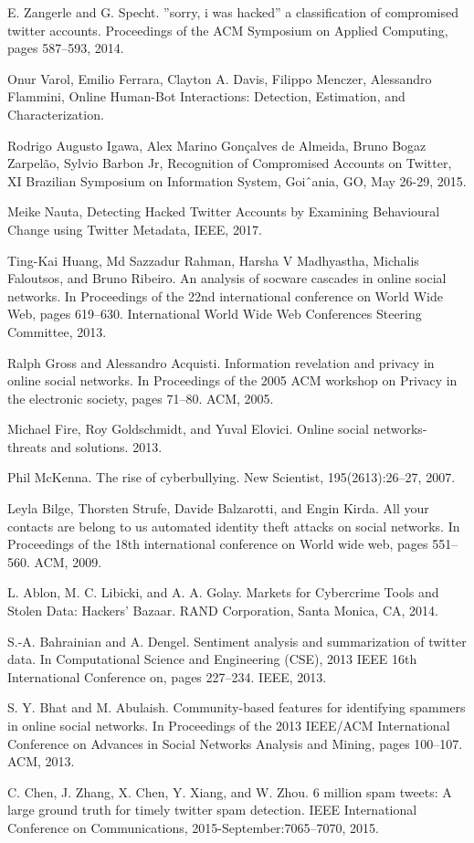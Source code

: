 \documentclass[conference]{IEEEtran}
\begin{document}
\begin{enumerate}[label={[\arabic*]}]
\item E. Zangerle and G. Specht. ”sorry, i was hacked” a
classification of compromised twitter accounts.
Proceedings of the ACM Symposium on Applied
Computing, pages 587–593, 2014.
\item Onur Varol, Emilio Ferrara, Clayton A. Davis, Filippo Menczer, Alessandro Flammini, Online Human-Bot Interactions: Detection, Estimation, and Characterization.
\item Rodrigo Augusto Igawa, Alex Marino Gonçalves de Almeida, Bruno Bogaz Zarpelão, Sylvio Barbon Jr,
Recognition of Compromised Accounts on Twitter, XI Brazilian Symposium on Information System, Goiˆania, GO, May 26-29, 2015.
\item Meike Nauta, Detecting Hacked Twitter Accounts by Examining
Behavioural Change using Twitter Metadata, IEEE, 2017.
\item Ting-Kai Huang, Md Sazzadur Rahman, Harsha V
Madhyastha, Michalis Faloutsos, and Bruno Ribeiro. An
analysis of socware cascades in online social networks.
In Proceedings of the 22nd international conference on
World Wide Web, pages 619–630. International World
Wide Web Conferences Steering Committee, 2013.
\item Ralph Gross and Alessandro Acquisti. Information
revelation and privacy in online social networks. In
Proceedings of the 2005 ACM workshop on Privacy in
the electronic society, pages 71–80. ACM, 2005.
\item Michael Fire, Roy Goldschmidt, and Yuval Elovici.
Online social networks- threats and solutions. 2013.
\item Phil McKenna. The rise of cyberbullying. New
Scientist, 195(2613):26–27, 2007.

\item Leyla Bilge, Thorsten Strufe, Davide Balzarotti, and
Engin Kirda. All your contacts are belong to us
automated identity theft attacks on social networks. In
Proceedings of the 18th international conference on
World wide web, pages 551–560. ACM, 2009.
\item L. Ablon, M. C. Libicki, and A. A. Golay. Markets
for Cybercrime Tools and Stolen Data: Hackers’
Bazaar. RAND Corporation, Santa Monica, CA,
2014.
\item S.-A. Bahrainian and A. Dengel. Sentiment analysis
and summarization of twitter data. In Computational
Science and Engineering (CSE), 2013 IEEE 16th
International Conference on, pages 227–234. IEEE,
2013.
\item S. Y. Bhat and M. Abulaish. Community-based
features for identifying spammers in online social
networks. In Proceedings of the 2013 IEEE/ACM
International Conference on Advances in Social Networks Analysis and Mining, pages 100–107. ACM,
2013.
\item C. Chen, J. Zhang, X. Chen, Y. Xiang, and
W. Zhou. 6 million spam tweets: A large ground
truth for timely twitter spam detection. IEEE
International Conference on Communications,
2015-September:7065–7070, 2015.

\end{enumerate}
\end{document}
